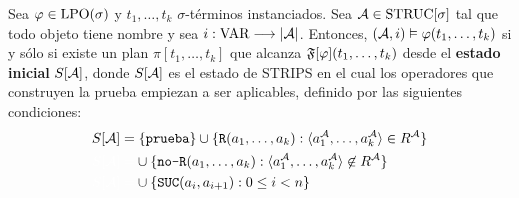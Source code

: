 \begin{theorem}
\label{teoremaprimerorden}
Sea $\varphi \in \text{LPO}(\sigma)$ y $t_1,\ldots,t_k$ $\sigma$-términos instanciados. Sea $\mathcal{A} \in
\text{STRUC}[\sigma]$ tal que todo objeto tiene nombre y sea $i : \text{VAR} \longrightarrow |\mathcal{A}|$.
Entonces, $(\mathcal{A}, i) \vDash \varphi(t_1,\ldots,t_k)$ si y sólo si
existe un plan $\pi[t_1,\ldots,t_k]$ que alcanza
$\mathfrak{F}[\varphi](t_1,\ldots,t_k)$ desde el \textbf{estado inicial} $S[\mathcal{A}]$,
donde $S[\mathcal{A}]$ es el estado de STRIPS en el cual los operadores que construyen la
prueba empiezan a ser aplicables, definido por las siguientes condiciones:
\begin{alignat*}{1}
& S[\A] = \{\texttt{prueba}\} \cup \{ \texttt{R}(a_1,\ldots,a_k) :
\tup{a_1^\A,\ldots,a_k^\A} \in R^\A\}\\
& {\color{white} S[\A] = } \cup \{\texttt{no-R}(a_1,\ldots,a_k) : \tup{a_1^\A,\ldots,a_k^\A} \not\in R^\A\}\\
& {\color{white} S[\A] = } \cup \{\texttt{SUC}(a_i, a_{i+1}) : 0 \leq i < n\}
\end{alignat*}
\end{theorem}
